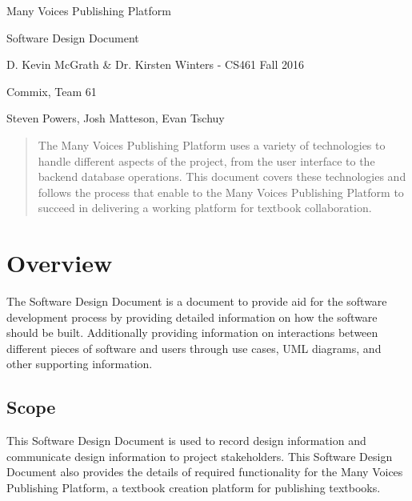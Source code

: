 \documentclass[letterpaper, 10pt, draftclsnofoot, compsoc, onecolumn]{IEEEtran}
\begin{document}
\begin{titlepage}
\centering
{\huge Many Voices Publishing Platform\par}
{\LARGE Software Design Document\par}
{\vspace{5mm}}
{\large D. Kevin McGrath \& Dr. Kirsten Winters -  CS461 Fall 2016\par}
{\large Commix, Team 61\par}
{\large Steven Powers, Josh Matteson, Evan Tschuy\par}
{\vspace{10mm}}

\begin{abstract}
\noindent The Many Voices Publishing Platform uses a variety of technologies 
to handle different aspects of the project, from the user interface to the 
backend database operations. This document covers these technologies and follows the process 
that enable to the Many Voices Publishing Platform to succeed in delivering 
a working platform for textbook collaboration.
\end{abstract}

\end{titlepage}

\tableofcontents

\newpage

\setcounter{page}{1}\pagestyle{fancy}





\vspace{1pc}
\section{Overview}
{\noindent The Software Design Document is a document to provide aid 
for the software development process by providing detailed information 
on how the software should be built. Additionally providing information 
on interactions between different pieces of software and users through 
use cases, UML diagrams, and other supporting information. \par}

\subsection{Scope}
{\noindent This Software Design Document is used to record design 
information and communicate design information to project stakeholders. 
This Software Design Document also provides the details of required 
functionality for the Many Voices Publishing Platform, a textbook creation 
platform for publishing textbooks.
\par}
\end{document}
